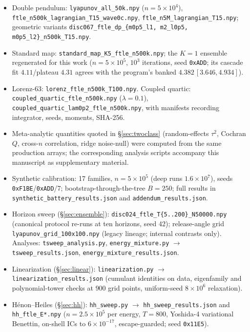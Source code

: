 \documentclass[11pt,a4paper]{article}
\theoremstyle{remark}
\begin{document}
\sloppy
\begin{itemize}\itemsep1pt
\item Double pendulum: \texttt{lyapunov\_all\_50k.npy} ($n = 5\times10^{4}$),
\texttt{ftle\_n500k\_lagrangian\_T15\_wave0c.npy}, \texttt{ftle\_n5M\_lagrangian\_T15.npy};
geometric variants \texttt{disc067\_ftle\_dp\_\{m0p5\_l1, m2\_l0p5, m0p5\_l2\}\_n500k\_T15.npy}.
\item Standard map: \texttt{standard\_map\_K5\_ftle\_n500k.npy}; the $K = 1$ ensemble regenerated
for this work ($n = 5\times10^{5}$, $10^{3}$ iterations, seed \texttt{0xADD}; its cascade fit
$4.11$/plateau $4.31$ agrees with the program's banked $4.382\,[3.646, 4.934]$).
\item Lorenz-63: \texttt{lorenz\_ftle\_n500k\_T100.npy}. Coupled quartic:
\texttt{coupled\_quartic\_ftle\_n500k.npy} ($\lambda = 0.1$),
\texttt{coupled\_quartic\_lam0p2\_ftle\_n500k.npy}, with manifests recording integrator, seeds,
moments, SHA-256.
\item Meta-analytic quantities quoted in \S\ref{sec:twoclass} (random-effects $\tau^2$, Cochran $Q$,
cross-$n$ correlation, ridge noise-null) were computed from the same production arrays; the
corresponding analysis scripts accompany this manuscript as supplementary material.
\item Synthetic calibration: 17 families, $n = 5\times10^{5}$ (deep runs $1.6\times10^{7}$), seeds
\texttt{0xF1BE}/\texttt{0xADD}/7; bootstrap-through-the-tree $B = 250$; full results in
\texttt{synthetic\_battery\_results.json} and \texttt{addendum\_results.json}.
\item Horizon sweep (\S\ref{sec:ensemble}): \texttt{disc024\_ftle\_T\{5..200\}\_N50000.npy}
(canonical protocol re-runs at ten horizons, seed 42); release-angle grid
\texttt{lyapunov\_grid\_100x100.npy} (legacy lineage; internal contrasts only). Analyses:
\texttt{tsweep\_analysis.py}, \texttt{energy\_mixture.py} $\to$ \texttt{tsweep\_results.json},
\texttt{energy\_mixture\_results.json}.
\item Linearization (\S\ref{sec:linear}): \texttt{linearization.py} $\to$
\texttt{linearization\_results.json} (cumulant identities on data, eigenfamily and polynomial-tower
checks at $900$ grid points, uniform-seed $8\times10^{6}$ relaxation).
\item H\'enon--Heiles (\S\ref{sec:hh}): \texttt{hh\_sweep.py} $\to$
\texttt{hh\_sweep\_results.json} and \texttt{hh\_ftle\_E*.npy} ($n = 2.5\times10^{5}$ per energy,
$T = 800$, Yoshida-4 variational Benettin, on-shell ICs to $6\times10^{-17}$, escape-guarded;
seed \texttt{0x11E5}).
\end{itemize}
\end{document}
